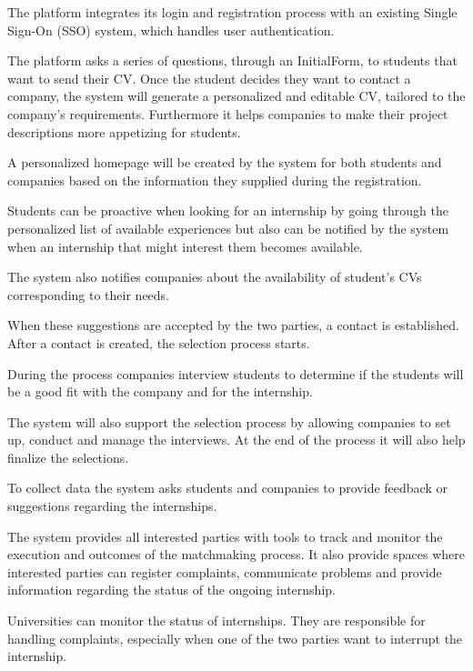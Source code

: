 The platform integrates its login and registration process with an existing Single Sign-On (SSO) system, which handles user authentication.

The platform asks a series of questions, through an InitialForm, to students that want to send their CV. Once the student decides they want to contact a company, the system will generate a personalized and editable CV, tailored to the company's requirements. Furthermore it helps companies to make their project descriptions more appetizing for students.

A personalized homepage will be created by the system for both students and companies based on the information they supplied during the registration.

Students can be proactive when looking for an internship by going through the personalized list of available experiences but also can be notified by the system when an internship that might interest them becomes available. 

The system also notifies companies about the availability of student's CVs corresponding to their needs.

When these suggestions are accepted by the two parties, a contact is established. After a contact is created, the selection process starts.

During the process companies interview students to determine if the students will be a good fit with the company and for the internship. 

The system will also support the selection process by allowing companies to set up, conduct and manage the interviews. At the end of the process it will also help finalize the selections.

To collect data the system asks students and companies to provide feedback or suggestions regarding the internships.

The system provides all interested parties with tools to track and monitor the execution and outcomes of the matchmaking process. It also provide spaces where interested parties can register complaints, communicate problems and provide information regarding the status of the ongoing internship.

Universities can monitor the status of internships. They are responsible for handling complaints, especially when one of the two parties want to interrupt the internship.

